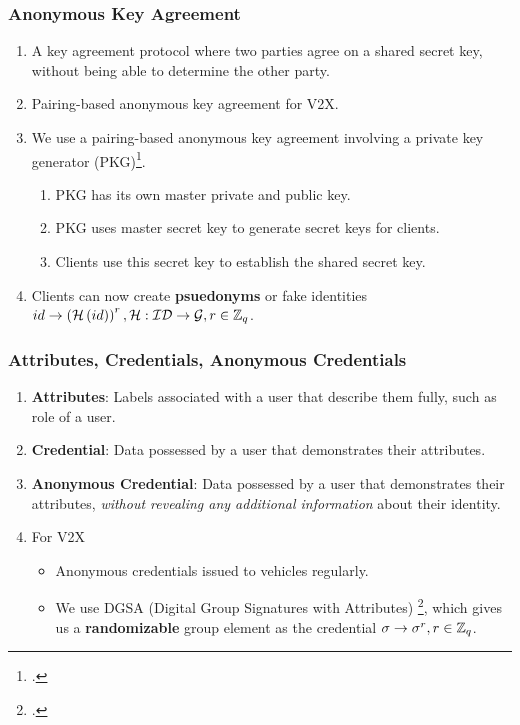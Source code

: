 \documentclass{beamer}
\begin{document}
    \begin{frame}
        \frametitle{Anonymous Key Agreement}
        \begin{enumerate}
            \item<1-> A key agreement protocol where two parties agree on a
            shared secret key, without being able to determine the other party.
            \item<2-> Pairing-based anonymous key agreement for V2X.
            \item<3-> We use a pairing-based anonymous key agreement involving a
            private key generator
            (PKG)\footcite{katePairingBasedOnionRouting2007}.
            \begin{enumerate}
                \item PKG has its own master private and public key.
                \item PKG uses master secret key to generate secret keys for
                clients.
                \item Clients use this secret key to establish the shared secret
                key.
            \end{enumerate}
            \item<4-> Clients can now create \textbf{psuedonyms} or fake
            identities \(id \rightarrow \left(\mathcal H\left(id\right)\right)^r,
            \mathcal H:\mathcal{ID}\rightarrow\mathcal G, r \in \mathbb Z_q\).
        \end{enumerate}
    \end{frame}

    \begin{frame}
        \frametitle{Attributes, Credentials, Anonymous Credentials}
        \begin{enumerate}
            \item<1-> \textbf{Attributes}: Labels associated with a user that
            describe them fully, such as role of a user.
            \item<2-> \textbf{Credential}: Data possessed by a user that
            demonstrates their attributes.
            \item<3-> \textbf{Anonymous Credential}: Data possessed by a user
            that demonstrates their attributes, \emph{without revealing any
            additional information} about their identity.
            \item<4-> For V2X
            \begin{itemize}
                \item Anonymous credentials issued to vehicles regularly.
                \item We use DGSA (Digital Group Signatures with Attributes)
                \footcite{camenischZoneEncryptionAnonymous2020}, which gives us
                a \textbf{randomizable} group element as the credential \(\sigma
                \rightarrow \sigma^r, r \in \mathbb Z_q\).
            \end{itemize}
        \end{enumerate}
    \end{frame}
\end{document}
